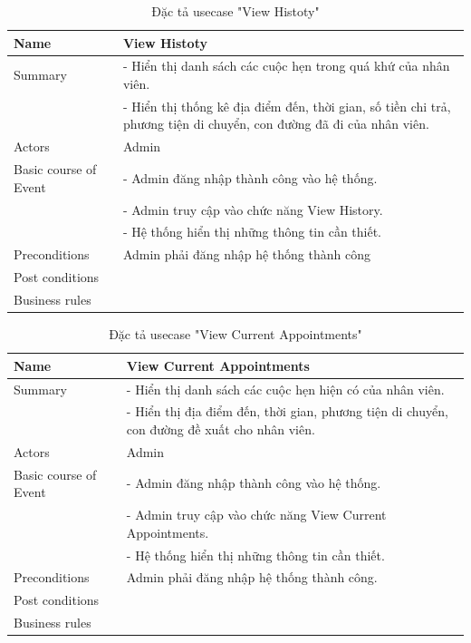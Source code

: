 \documentclass[a4paper]{article}
\begin{document}
\clearpage
\begin{table}[!h]
    \centering
        \begin{tabular}{|m{3.2cm}|m{10.5cm}|}
        \hline
        Name & View Histoty\\
        \hline
        Summary & -	Hiển thị danh sách các cuộc hẹn trong quá khứ của nhân viên.\\
&-	Hiển thị thống kê địa điểm đến, thời gian, số tiền chi trả, phương tiện di chuyển, con đường đã đi của nhân viên.\\
        \hline
        Actors & Admin\\
        \hline
        Basic course of Event & - Admin đăng nhập thành công vào hệ thống.\\
&-	Admin truy cập vào chức năng View History.\\
&-	Hệ thống hiển thị những thông tin cần thiết.\\
        \hline
        Preconditions & Admin phải đăng nhập hệ thống thành công \\
        \hline
        Post conditions & \\
        \hline
        Business rules & \\
        \hline
        \end{tabular}
        \caption{Đặc tả usecase "View Histoty"}
\end{table}
\begin{table}[!h]
    \centering
        \begin{tabular}{|m{3.2cm}|m{10.5cm}|}
        \hline
        Name & View Current Appointments\\
        \hline
        Summary & -	Hiển thị danh sách các cuộc hẹn hiện có của nhân viên.\\
&-	Hiển thị địa điểm đến, thời gian, phương tiện di chuyển, con đường đề xuất cho nhân viên.\\
        \hline
        Actors & Admin\\
        \hline
        Basic course of Event & -	Admin đăng nhập thành công vào hệ thống.\\
&-	Admin truy cập vào chức năng View Current Appointments.\\
&-	Hệ thống hiển thị những thông tin cần thiết.\\
        \hline
        Preconditions & Admin phải đăng nhập hệ thống thành công. \\
        \hline
        Post conditions & \\
        \hline
        Business rules & \\
        \hline
        \end{tabular}
        \caption{Đặc tả usecase "View Current Appointments"}
\end{table}
\end{document}
